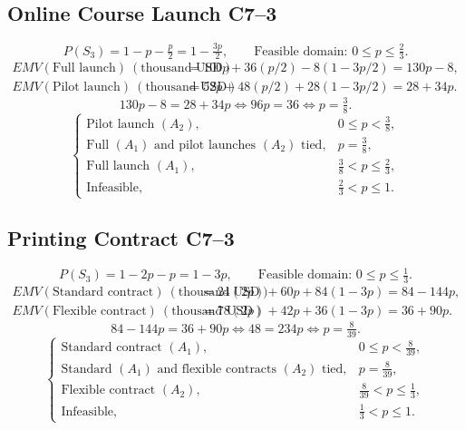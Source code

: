 {\subsection{Online Course Launch \hfill C7--3}
\label{summary:online-course-launch}
\[
P(S_3)=1-p-\tfrac p2=1-\tfrac{3p}{2},\qquad
\text{Feasible domain: }0\le p\le\tfrac23.
\]
\begin{align*}
EMV(\text{Full launch})\ (\text{thousand USD})
  &=100p+36(p/2)-8(1-3p/2)=130p-8,\\
EMV(\text{Pilot launch})\ (\text{thousand USD})
  &=52p+48(p/2)+28(1-3p/2)=28+34p.
\end{align*}
\[
130p-8=28+34p\iff96p=36\iff p=\tfrac38.
\]
\[
\boxed{\begin{cases}
\text{Pilot launch }(A_2),&0\le p<\frac38,\\
\text{Full }(A_1)\text{ and pilot launches }(A_2)\text{ tied},&p=\frac38,\\
\text{Full launch }(A_1),&\frac38<p\le\frac23,\\
\text{Infeasible},&\frac23<p\le1.
\end{cases}}
\]
\subsection{Printing Contract \hfill C7--3}
\label{summary:printing-contract}
\[
P(S_3)=1-2p-p=1-3p,\qquad
\text{Feasible domain: }0\le p\le\tfrac13.
\]
\begin{align*}
EMV(\text{Standard contract})\ (\text{thousand USD})
  &=24(2p)+60p+84(1-3p)=84-144p,\\
EMV(\text{Flexible contract})\ (\text{thousand USD})
  &=78(2p)+42p+36(1-3p)=36+90p.
\end{align*}
\[
84-144p=36+90p\iff48=234p\iff p=\tfrac8{39}.
\]
\[
\boxed{\begin{cases}
\text{Standard contract }(A_1),&0\le p<\frac8{39},\\
\text{Standard }(A_1)\text{ and flexible contracts }(A_2)\text{ tied},&p=\frac8{39},\\
\text{Flexible contract }(A_2),&\frac8{39}<p\le\frac13,\\
\text{Infeasible},&\frac13<p\le1.
\end{cases}}
\]
}

